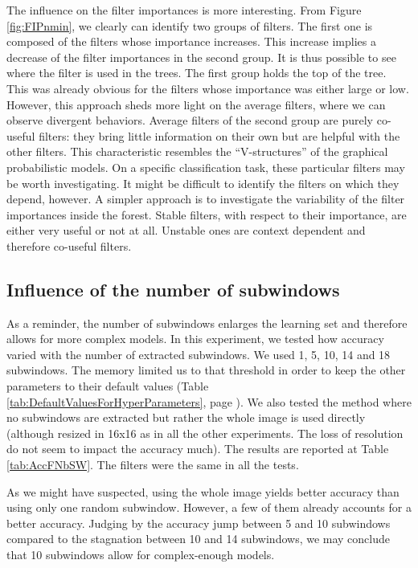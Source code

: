 \documentclass[a4paper]{report}
\newlength{\larg}
\begin{document}
	
		\par
		The influence on the filter importances is more interesting. From Figure \ref{fig:FIPnmin}, we clearly can identify two groups of filters. The first one is composed of the filters whose importance increases. This increase implies a decrease of the filter importances in the second group. It is thus possible to see where the filter is used in the trees. The first group holds the top of the tree. This was already obvious for the filters whose importance was either large or low. However, this approach sheds more light on the average filters, where we can observe divergent behaviors. Average filters of the second group are purely co-useful filters: they bring little information on their own but are helpful with the other filters. This characteristic resembles the ``V-structures'' of the graphical probabilistic models. On a specific classification task, these particular filters may be worth investigating. It might be difficult to identify the filters on which they depend, however. A simpler approach is to investigate the variability of the filter importances inside the forest. Stable filters, with respect to their importance, are either very useful or not at all. Unstable ones are context dependent and therefore co-useful filters.
	
		
		
		
		
		
	
		\subsection{Influence of the number of subwindows}
		As a reminder, the number of subwindows enlarges the learning set and therefore allows for more complex models. In this experiment, we tested how accuracy varied with the number of extracted subwindows. We used 1, 5, 10, 14 and 18 subwindows. The memory limited us to that threshold in order to keep the other parameters to their default values (Table \ref{tab:DefaultValuesForHyperParameters}, page \pageref{tab:DefaultValuesForHyperParameters}). We also tested the method where no subwindows are extracted but rather the whole image is used directly (although resized in 16x16 as in all the other experiments. The loss of resolution do not seem to impact the accuracy much). The results are reported at Table \ref{tab:AccFNbSW}. The filters were the same in all the tests.
		\par
		As we might have suspected, using the whole image yields better accuracy than using only one random subwindow. However, a few of them already accounts for a better accuracy. Judging by the accuracy jump between 5 and 10 subwindows compared to the stagnation between 10 and 14 subwindows, we may conclude that 10 subwindows allow for complex-enough models. 
		
\end{document}
